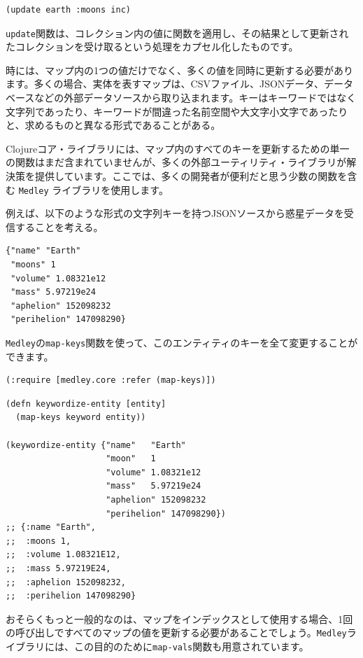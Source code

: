 \begin{lstlisting}[numbers=none]
(update earth :moons inc)
\end{lstlisting}

\texttt{update}関数は、コレクション内の値に関数を適用し、その結果として更新されたコレクションを受け取るという処理をカプセル化したものです。

時には、マップ内の1つの値だけでなく、多くの値を同時に更新する必要があります。多くの場合、実体を表すマップは、CSVファイル、JSONデータ、データベースなどの外部データソースから取り込まれます。キーはキーワードではなく文字列であったり、キーワードが間違った名前空間や大文字小文字であったりと、求めるものと異なる形式であることがある。

Clojureコア・ライブラリには、マップ内のすべてのキーを更新するための単一の関数はまだ含まれていませんが、多くの外部ユーティリティ・ライブラリが解決策を提供しています。ここでは、多くの開発者が便利だと思う少数の関数を含む \texttt{Medley} ライブラリを使用します。

例えば、以下のような形式の文字列キーを持つJSONソースから惑星データを受信することを考える。


\begin{lstlisting}[numbers=none]
{"name" "Earth"
 "moons" 1
 "volume" 1.08321e12
 "mass" 5.97219e24
 "aphelion" 152098232
 "perihelion" 147098290}
\end{lstlisting}

\texttt{Medley}の\texttt{map-keys}関数を使って、このエンティティのキーを全て変更することができます。

\begin{lstlisting}[numbers=none]
(:require [medley.core :refer (map-keys)])
\end{lstlisting}

\begin{lstlisting}[numbers=none]
(defn keywordize-entity [entity]
  (map-keys keyword entity))

(keywordize-entity {"name"   "Earth"
                    "moon"   1
                    "volume" 1.08321e12
                    "mass"   5.97219e24
                    "aphelion" 152098232
                    "perihelion" 147098290})
;; {:name "Earth",
;;  :moons 1,
;;  :volume 1.08321E12,
;;  :mass 5.97219E24,
;;  :aphelion 152098232,
;;  :perihelion 147098290}
\end{lstlisting}

おそらくもっと一般的なのは、マップをインデックスとして使用する場合、1回の呼び出しですべてのマップの値を更新する必要があることでしょう。\texttt{Medley}ライブラリには、この目的のために\texttt{map-vals}関数も用意されています。

